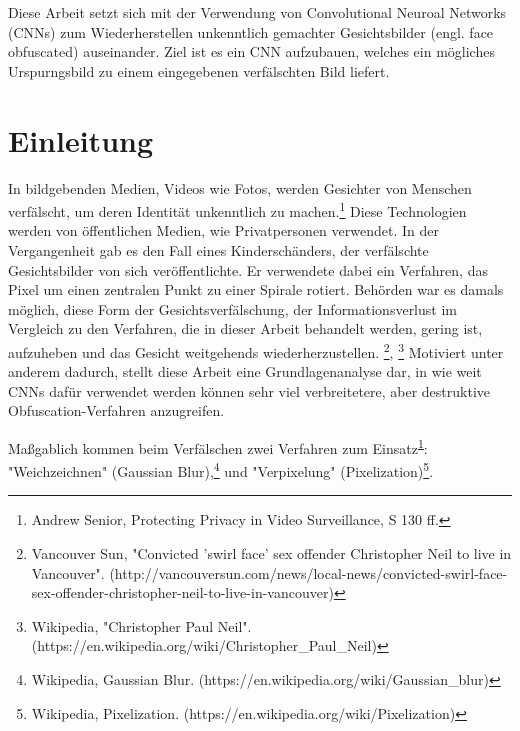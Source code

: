 \documentclass[
12pt, %
a4paper, %
oneside, %
headinclude,footinclude, %
BCOR5mm, %
german]{scrartcl}
\begin{document}
Diese Arbeit setzt sich mit der Verwendung von Convolutional Neuroal Networks (CNNs) zum Wiederherstellen
unkenntlich gemachter Gesichtsbilder (engl. face obfuscated) auseinander. Ziel ist es ein CNN aufzubauen,
welches ein mögliches Urspurngsbild zu einem eingegebenen verfälschten Bild liefert.




\newpage %


\section{Einleitung}

In bildgebenden Medien, Videos wie Fotos, werden Gesichter von Menschen verfälscht, um deren Identität unkenntlich
zu machen.\footnote{Andrew Senior, Protecting Privacy in Video Surveillance, S 130 ff.\label{label:protecting_privacy}}
Diese Technologien werden von
öffentlichen Medien, wie Privatpersonen verwendet. In der Vergangenheit
gab es den Fall eines Kinderschänders, der verfälschte Gesichtsbilder von sich veröffentlichte. Er verwendete dabei
ein Verfahren, das Pixel um einen zentralen Punkt zu einer Spirale rotiert. Behörden war es damals möglich, diese
Form der Gesichtsverfälschung, der Informationsverlust im Vergleich zu den Verfahren, die in dieser Arbeit behandelt
werden, gering ist, aufzuheben und das Gesicht weitgehends wiederherzustellen.
\footnote{Vancouver Sun, "Convicted 'swirl face' sex offender Christopher Neil to live in Vancouver".
(http://vancouversun.com/news/local-news/convicted-swirl-face-sex-offender-christopher-neil-to-live-in-vancouver)},
\footnote{Wikipedia, "Christopher Paul Neil". (https://en.wikipedia.org/wiki/Christopher\_Paul\_Neil)}
Motiviert unter anderem dadurch,
stellt diese Arbeit eine Grundlagenanalyse dar, in wie weit CNNs dafür verwendet werden können sehr viel verbreitetere,
aber destruktive Obfuscation-Verfahren anzugreifen.

Maßgablich kommen beim Verfälschen zwei Verfahren zum Einsatz\textsuperscript{\ref{label:protecting_privacy}}:
"Weichzeichnen" (Gaussian Blur),\footnote{Wikipedia, Gaussian Blur. (https://en.wikipedia.org/wiki/Gaussian\_blur)}
und "Verpixelung" (Pixelization)\footnote{Wikipedia, Pixelization. (https://en.wikipedia.org/wiki/Pixelization)\label{label:pixelization}}.
\end{document}
